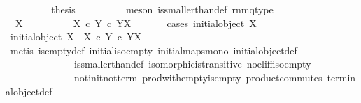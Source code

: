 \begin{isabellebody}
\ \ \ \ \ \ \isamarkupfalse%
\ \isamarkupfalse%
\ {\isacharquery}{\kern0pt}thesis\isanewline
\ \ \ \ \ \ \ \ \isamarkupfalse%
\ {\isacharparenleft}{\kern0pt}meson\ is{\isacharunderscore}{\kern0pt}smaller{\isacharunderscore}{\kern0pt}than{\isacharunderscore}{\kern0pt}def\ rnmq{\isacharunderscore}{\kern0pt}type{\isacharparenright}{\kern0pt}\isanewline
\ \ \ \ \isamarkupfalse%
\isanewline
\ \ \ \ \ \ \isamarkupfalse%
\ {\isachardoublequoteopen}{\isasymnot}\ X\ {\isasymcong}\ {\isasymOmega}{\isachardoublequoteclose}\isanewline
\ \ \ \ \ \ \isamarkupfalse%
\ {\isachardoublequoteopen}X\ {\isasymtimes}\isactrlsub c\ Y\ {\isasymle}\isactrlsub c\ Y\isactrlbsup X\isactrlesup {\isachardoublequoteclose}\isanewline
\ \ \ \ \ \ \isamarkupfalse%
{\isacharparenleft}{\kern0pt}cases\ {\isachardoublequoteopen}initial{\isacharunderscore}{\kern0pt}object\ X{\isachardoublequoteclose}{\isacharparenright}{\kern0pt}\isanewline
\ \ \ \ \ \ \ \ \isamarkupfalse%
\ {\isachardoublequoteopen}initial{\isacharunderscore}{\kern0pt}object\ X\ {\isasymLongrightarrow}\ X\ {\isasymtimes}\isactrlsub c\ Y\ {\isasymle}\isactrlsub c\ Y\isactrlbsup X\isactrlesup {\isachardoublequoteclose}\isanewline
\ \ \ \ \ \ \ \ \ \ \isamarkupfalse%
\ {\isacharparenleft}{\kern0pt}metis\ is{\isacharunderscore}{\kern0pt}empty{\isacharunderscore}{\kern0pt}def\ initial{\isacharunderscore}{\kern0pt}iso{\isacharunderscore}{\kern0pt}empty\ initial{\isacharunderscore}{\kern0pt}maps{\isacharunderscore}{\kern0pt}mono\ initial{\isacharunderscore}{\kern0pt}object{\isacharunderscore}{\kern0pt}def\ \isanewline
\ \ \ \ \ \ \ \ \ \ \ \ \ \ is{\isacharunderscore}{\kern0pt}smaller{\isacharunderscore}{\kern0pt}than{\isacharunderscore}{\kern0pt}def\ isomorphic{\isacharunderscore}{\kern0pt}is{\isacharunderscore}{\kern0pt}transitive\ no{\isacharunderscore}{\kern0pt}el{\isacharunderscore}{\kern0pt}iff{\isacharunderscore}{\kern0pt}iso{\isacharunderscore}{\kern0pt}empty\isanewline
\ \ \ \ \ \ \ \ \ \ \ \ \ \ not{\isacharunderscore}{\kern0pt}init{\isacharunderscore}{\kern0pt}not{\isacharunderscore}{\kern0pt}term\ prod{\isacharunderscore}{\kern0pt}with{\isacharunderscore}{\kern0pt}empty{\isacharunderscore}{\kern0pt}is{\isacharunderscore}{\kern0pt}empty{}\ product{\isacharunderscore}{\kern0pt}commutes\ terminal{\isacharunderscore}{\kern0pt}object{\isacharunderscore}{\kern0pt}def{\isacharparenright}{\kern0pt}\isanewline
\ \ \ \ \ \ \isamarkupfalse%
\isanewline

\end{isabellebody}
